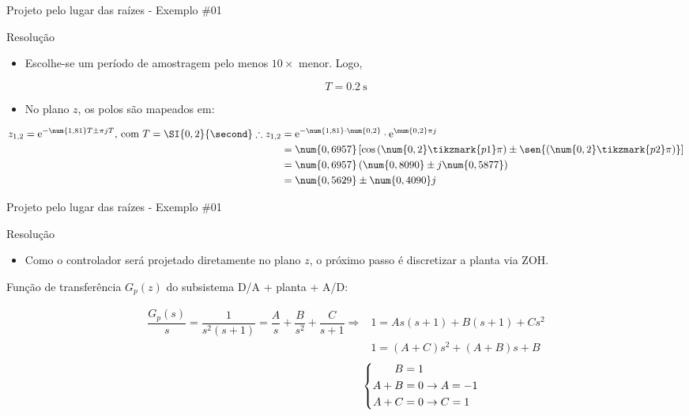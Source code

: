 \begin{frame}{Projeto pelo lugar das raízes - Exemplo \#01}
\begin{block}{Resolução}
\begin{itemize}
    \item Escolhe-se um período de amostragem pelo menos $ 10\times $ menor. Logo,
\end{itemize}
	 
	\[ T=\SI{0,2}{\second} \]

\begin{itemize}
    \item No plano $z$, os polos são mapeados em:
\end{itemize}
\begin{align*}
		z_{1,2}=\text{e}^{-\num{1,81}T\pm\pi jT}\text{, com } T=\SI{0,2}{\second}\therefore
		z_{1,2}&=\text{e}^{-\num{1,81}\cdot\num{0,2}}\cdot\text{e}^{\num{0,2}\pi j}\\
		&=\num{0,6957}\left[ \cos{(\num{0,2}\tikzmark{p1}\pi)}\pm\sen{(\num{0,2}\tikzmark{p2}\pi)}\right]\\
		&=\num{0,6957}\left( \num{0,8090}\pm j\num{0,5877} \right)\\
		&=\num{0,5629}\pm\num{0,4090}j
		\end{align*}
\end{block}
\end{frame}


\begin{frame}{Projeto pelo lugar das raízes - Exemplo \#01}
\begin{block}{Resolução}
\begin{itemize}
    \item Como o controlador será projetado diretamente no plano $z$, o próximo passo é discretizar a planta via ZOH.
\end{itemize}
	Função de transferência $ G_p(z) $ do subsistema D/A + planta + A/D:
	
	\begin{align*}
		\dfrac{G_p(s)}{s}=\dfrac{1}{s^{2}(s+1)}=\dfrac{A}{s}+\dfrac{B}{s^{2}}+\dfrac{C}{s+1}\Rightarrow &1=As(s+1)+B(s+1)+Cs^{2}\\
		&1=(A+C)s^{2}+(A+B)s+B
	\end{align*}
	\[\makebox[13.5em]{}\left\lbrace\begin{aligned}
	B&=1 \\
	A+B&=0\rightarrow A=-1\\
	A+C&=0 \rightarrow C=1
	\end{aligned}\right. \]
\end{block}
\end{frame}


